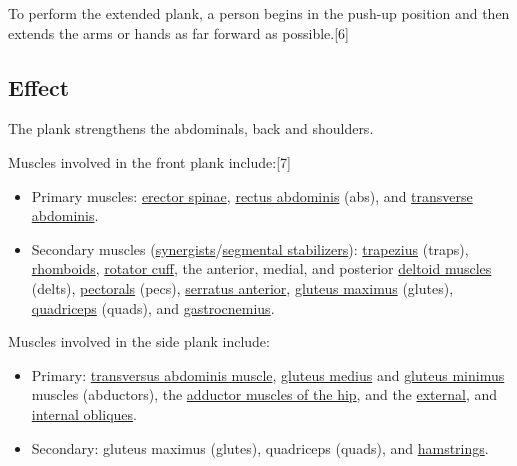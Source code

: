 \documentclass[oneside]{book}
\numberwithin{equation}{section}
\begin{document}
To perform the extended plank, a person begins in the push-up position and then extends the arms or hands as far forward as possible.[6]

\subsection{Effect}
The plank strengthens the abdominals, back and shoulders.

Muscles involved in the front plank include:[7]
\begin{itemize}
    \item Primary muscles: \href{https://en.wikipedia.org/wiki/Erector_spinae_muscles}{erector spinae}, \href{https://en.wikipedia.org/wiki/Rectus_abdominis_muscle}{rectus abdominis} (abs), and \href{https://en.wikipedia.org/wiki/Transversus_abdominis_muscle}{transverse abdominis}.
    \item Secondary muscles (\href{https://en.wikipedia.org/wiki/Anatomical_terms_of_muscle#Synergist}{synergists}/\href{https://en.wikipedia.org/wiki/Segmental_stabilizers}{segmental stabilizers}): \href{https://en.wikipedia.org/wiki/Trapezius_muscle}{trapezius} (traps), \href{https://en.wikipedia.org/wiki/Rhomboid_muscles}{rhomboids}, \href{https://en.wikipedia.org/wiki/Rotator_cuff}{rotator cuff}, the anterior, medial, and posterior \href{https://en.wikipedia.org/wiki/Deltoid_muscle}{deltoid muscles} (delts), \href{https://en.wikipedia.org/wiki/Pectoralis_major_muscle}{pectorals} (pecs), \href{https://en.wikipedia.org/wiki/Serratus_anterior_muscle}{serratus anterior}, \href{https://en.wikipedia.org/wiki/Gluteus_maximus_muscle}{gluteus maximus} (glutes), \href{https://en.wikipedia.org/wiki/Quadriceps_femoris_muscle}{quadriceps} (quads), and \href{https://en.wikipedia.org/wiki/Gastrocnemius_muscle}{gastrocnemius}.
\end{itemize}
Muscles involved in the side plank include: 
\begin{itemize}
    \item Primary: \href{https://en.wikipedia.org/wiki/Transversus_abdominis_muscle}{transversus abdominis muscle}, \href{https://en.wikipedia.org/wiki/Gluteus_medius_muscle}{gluteus medius} and \href{https://en.wikipedia.org/wiki/Gluteus_minimus_muscle}{gluteus minimus} muscles (abductors), the \href{https://en.wikipedia.org/wiki/Adductor_muscles_of_the_hip}{adductor muscles of the hip}, and the \href{https://en.wikipedia.org/wiki/Abdominal_external_oblique_muscle}{external}, and \href{https://en.wikipedia.org/wiki/Abdominal_internal_oblique_muscle}{internal obliques}.
    \item Secondary: gluteus maximus (glutes), quadriceps (quads), and \href{https://en.wikipedia.org/wiki/Hamstring}{hamstrings}.
\end{itemize}
\end{document}

